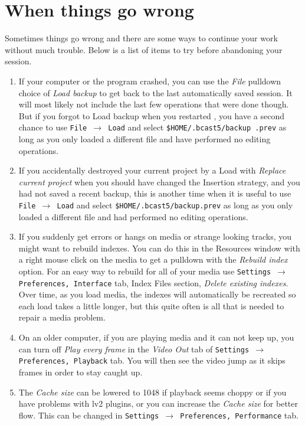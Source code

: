 \section{When things go wrong}%
\label{cha:when_things_go_wrong}

Sometimes things go wrong and there are some ways to continue your work without much trouble. Below is a list of items
to try before abandoning your session.

\begin{enumerate}
        \item If your computer or the program crashed, you can use the \textit{File} pulldown choice
of \textit{Load backup} to get back to the last automatically saved session. It will most
likely not include the last few operations that were done though.  But if you forgot to 
Load backup when you restarted ,\CGG{} you have a second chance to use \texttt{File $\rightarrow$ Load} and
select \texttt{\$HOME/.bcast5/backup .prev} as long as you only loaded a different file and have
performed no editing operations.
         \item If you accidentally destroyed your current project by a Load with 
\textit{Replace current project} when you should have changed the Insertion strategy, and 
you had not saved a recent backup, this is another time when it is useful to use
\texttt{File $\rightarrow$ Load} and
select \texttt{\$HOME/.bcast5/backup.prev} as long as you only loaded a different
file and had performed no editing operations.
	\item If you suddenly get errors or hangs on media or strange looking tracks, you might want to rebuild indexes. You can do this in the Resources window with a right mouse click on the media to get a pulldown with the \textit{Rebuild index} option. For an easy way to rebuild for all of your media use \texttt{Settings $\rightarrow$ Preferences, Interface} tab, Index Files section, \textit{Delete existing indexes}. Over time, as you
load media, the indexes will automatically be recreated so each load takes a little longer, but this quite often
is all that is needed to repair a media problem.
	\item On an older computer, if you are playing media and it can not keep up, you can turn off \textit{Play every frame} in the \textit{Video Out} tab of \texttt{Settings $\rightarrow$ Preferences, Playback} tab. You will then see the video jump as it skips frames in order to stay caught up.
	\item The \textit{Cache size} can be lowered to 1048 if playback seems choppy or if you have problems with lv2 plugins, or you can increase the \textit{Cache size} for better flow. This can be changed in \texttt{Settings $\rightarrow$ Preferences, Performance} tab.

\end{enumerate}
